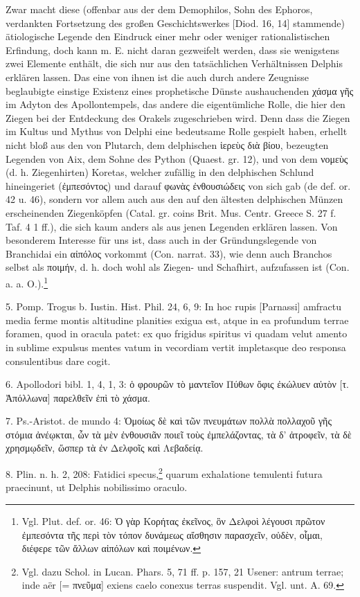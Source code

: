\documentclass[a4paper, 11pt, oneside]{article}
\begin{document}
Zwar macht diese (offenbar aus der dem Demophilos, Sohn des Ephoros, verdankten Fortsetzung des großen Geschichtswerkes [Diod. 16, 14] stammende) ätiologische Legende den Eindruck einer mehr oder weniger rationalistischen Erfindung, doch kann m. E. nicht daran gezweifelt werden, dass sie wenigstens zwei Elemente enthält, die sich nur aus den tatsächlichen Verhältnissen Delphis erklären lassen. Das eine von ihnen ist die auch durch andere Zeugnisse beglaubigte einstige Existenz eines prophetische Dünste aushauchenden χάσμα γῆς im Adyton des Apollontempels, das andere die eigentümliche Rolle, die hier den Ziegen bei der Entdeckung des Orakels zugeschrieben wird. Denn dass die Ziegen im Kultus und Mythus von Delphi eine bedeutsame Rolle gespielt haben, erhellt nicht bloß aus den von Plutarch, dem delphischen ἱερεὺς διὰ βίου, bezeugten Legenden von Aix, dem Sohne des Python (Quaest. gr. 12), und von dem νομεὺς (d. h. Ziegenhirten) Koretas, welcher zufällig in den delphischen Schlund hineingeriet (ἐμπεσόντος) und darauf φωνὰς ἐνθουσιώδεις von sich gab (de def. or. 42 u. 46), sondern vor allem auch aus den auf den ältesten delphischen Münzen erscheinenden Ziegenköpfen (Catal. gr. coins Brit. Mus. Centr. Greece S. 27 f. Taf. 4 1 ff.), die sich kaum anders als aus jenen Legenden erklären lassen. Von besonderem Interesse für uns ist, dass auch in der Gründungslegende von Branchidai ein αἰπόλος vorkommt (Con. narrat. 33), wie denn auch Branchos selbst als ποιμήν, d. h. doch wohl als Ziegen- und Schafhirt, aufzufassen ist (Con. a. a. O.).\footnote{Vgl. Plut. def. or. 46: Ὁ γὰρ Κορήτας ἐκεῖνος, ὃν Δελφοὶ λέγουσι πρῶτον ἐμπεσόντα τῆς περὶ τὸν τόπον δυνάμεως αἴσθησιν παρασχεῖν, οὐδὲν, οἶμαι, διέφερε τῶν ἄλλων αἰπόλων καὶ ποιμένων.}

5. Pomp. Trogus b. Iustin. Hist. Phil. 24, 6, 9: In hoc rupis [Parnassi] amfractu media ferme montis altitudine planities exigua est, atque in ea profundum terrae foramen, quod in oracula patet: ex quo frigidus spiritus vi quadam velut amento in sublime expulsus mentes vatum in vecordiam vertit impletasque deo responsa consulentibus dare cogit.

6. Apollodori bibl. 1, 4, 1, 3: ὁ φρουρῶν τὸ μαντεῖον Πύθων ὄφις ἐκώλυεν αὐτὸν [τ. Ἀπόλλωνα] παρελθεῖν ἐπὶ τὸ χάσμα.

7. Ps.-Aristot. de mundo 4: Ὁμοίως δὲ καὶ τῶν πνευμάτων πολλὰ πολλαχοῦ γῆς στόμια ἀνέῳκται, ὧν τὰ μὲν ἐνθουσιᾶν ποιεῖ τοὺς ἐμπελάζοντας, τὰ δ' ἀτροφεῖν, τὰ δὲ χρησμῳδεῖν, ὥσπερ τὰ ἐν Δελφοῖς καὶ Λεβαδείᾳ.

8. Plin. n. h. 2, 208: Fatidici specus,\footnote{Vgl. dazu Schol. in Lucan. Phars. 5, 71 ff. p. 157, 21 Usener: antrum terrae; inde aër [= πνεῦμα] exiens caelo conexus terras suspendit. Vgl. unt. A. 69.} quarum exhalatione temulenti futura praecinunt, ut Delphis nobilissimo oraculo.
\end{document}
